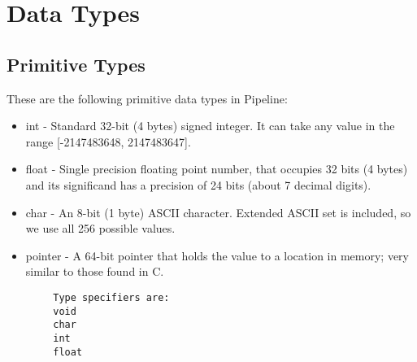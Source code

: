 \documentclass[./LRM_main.tex]{subfiles}
\begin{document}


\chapter{Data Types}



\section{Primitive Types}
These are the following primitive data types in Pipeline:
\begin{itemize}
    \item int -  Standard 32-bit (4 bytes) signed integer. It can take any value in the range [-2147483648, 2147483647].
    \item float - Single precision floating point number, that occupies 32 bits (4 bytes) and its significand has a precision of 24 bits (about 7 decimal digits). 
    \item char - An 8-bit (1 byte) ASCII character. Extended ASCII set is included, so we use all 256 possible values.
    \item pointer - A 64-bit pointer that holds the value to a location in memory; very similar to those found in C.
\end{itemize}
\begin{lstlisting}
        Type specifiers are:
        void
        char
        int
        float

\end{lstlisting}
\end{document}
